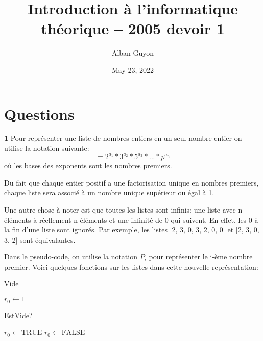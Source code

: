 \documentclass{article}
\title{Introduction à l'informatique théorique -- 2005 devoir 1}
\author{Alban Guyon}
\date{May 23, 2022}
\begin{document}
    \maketitle
    \section{Questions}
    
    \textbf{1}
    Pour représenter une liste de nombres entiers en un seul nombre entier on utilise la notation suivante:
    \begin{equation}
    [a_1, a_2, a_3, ..., a_n, 0, 0, 0, ...] = 2^{a_1} * 3^{a_2} * 5^{a_3} * ... * p^{a_n}
    \end{equation}
    où les bases des exponents sont les nombres premiers.

    Du fait que chaque entier positif a une factorisation unique en nombres premiers, chaque liste
    sera associé à un nombre unique supérieur ou égal à 1.

    Une autre chose à noter est que toutes les listes sont infinis: une liste avec n éléments à réellement n
    éléments et une infinité de 0 qui suivent. En effet, les 0 à la fin d'une liste sont ignorés. 
    Par exemple, les listes [2, 3, 0, 3, 2, 0, 0] et [2, 3, 0, 3, 2] sont équivalantes.

    Dans le pseudo-code, on utilise la notation $P_i$ pour représenter le i-ème nombre premier.	
    Voici quelques fonctions sur les listes dans cette nouvelle représentation:

    \begin{algorithm}[H]
        \caption{Vide}\label{Vide}
        \begin{algorithmic}
        \State $\textit{$r_0$} \gets \text{1}$
        \EndProcedure
        \end{algorithmic}
    \end{algorithm}

    \begin{algorithm}[H]
        \caption{EstVide?}\label{EstVide?}
        \begin{algorithmic}
            \State $\textit{$r_0$} \gets \text{TRUE}$
        \Else {}
            \State $\textit{$r_0$} \gets \text{FALSE}$
        \EndIf
        \EndProcedure
        \end{algorithmic}
    \end{algorithm}
\end{document}
